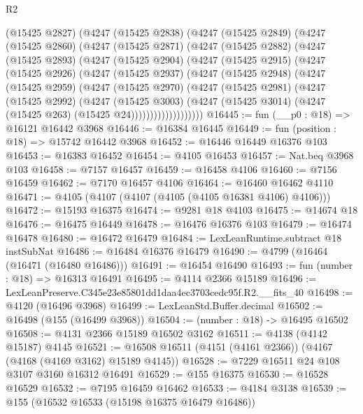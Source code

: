 \begin{lexlean}{R2}
\begin{coremodule}
    (@15425 @2827)
    (@4247
      (@15425 @2838)
      (@4247
        (@15425 @2849)
        (@4247
          (@15425 @2860)
          (@4247
            (@15425 @2871)
            (@4247
              (@15425 @2882)
              (@4247
                (@15425 @2893)
                (@4247
                  (@15425 @2904)
                  (@4247
                    (@15425 @2915)
                    (@4247
                      (@15425 @2926)
                      (@4247
                        (@15425 @2937)
                        (@4247
                          (@15425 @2948)
                          (@4247
                            (@15425 @2959)
                            (@4247
                              (@15425 @2970)
                              (@4247
                                (@15425 @2981)
                                (@4247
                                  (@15425 @2992)
                                  (@4247
                                    (@15425 @3003)
                                    (@4247
                                      (@15425 @3014)
                                      (@4247 (@15425 @263) (@15425 @24)))))))))))))))))))
@16445 := fun (__p0 : @18) => @16121 @16442 @3968
@16446 := @16384 @16445
@16449 := fun (position : @18) => @15742 @16442 @3968
@16452 := @16446 @16449 @16376 @103
@16453 := @16383 @16452
@16454 := @4105 @16453
@16457 := Nat.beq @3968 @103
@16458 := @7157 @16457
@16459 := @16458 @4106
@16460 := @7156 @16459
@16462 := @7170 @16457 @4106
@16464 := @16460 @16462 @4110
@16471 := @4105 (@4107 (@4107 (@4105 (@4105 @16381 @4106) @4106)))
@16472 := @15193 @16375
@16474 := @9281 @18 @4103
@16475 := @14674 @18
@16476 := @16475 @16449
@16478 := @16476 @16376 @103
@16479 := @16474 @16478
@16480 := @16472 @16479
@16484 := LexLeanRuntime.subtract @18 instSubNat
@16486 := @16484 @16376 @16479
@16490 := @4799 (@16464 (@16471 (@16480 @16486)))
@16491 := @16454 @16490
@16493 := fun (number : @18) => @16313 @16491
@16495 := @4114 @2366 @15189
@16496 := LexLeanPreserve.C345e23e85801dd1daa4ec3703cedc95f.R2.__fits_40
@16498 := @4120 (@16496 @3968)
@16499 := LexLeanStd.Buffer.decimal
@16502 := @16498 (@155 (@16499 @3968))
@16504 := (number : @18) -> @16495 @16502
@16508 := @4131 @2366 @15189 @16502 @3162
@16511 := @4138 (@4142 @15187) @4145
@16521 := @16508 @16511 (@4151 (@4161 @2366)) (@4167 (@4168 (@4169 @3162) @15189 @4145))
@16528 := @7229 @16511 @24 @108 @3107 @3160 @16312 @16491
@16529 := @155 @16375
@16530 := @16528 @16529
@16532 := @7195 @16459 @16462
@16533 := @4184 @3138
@16539 := @155 (@16532 @16533 (@15198 @16375 @16479 @16486))

\end{coremodule}
\end{lexlean}
